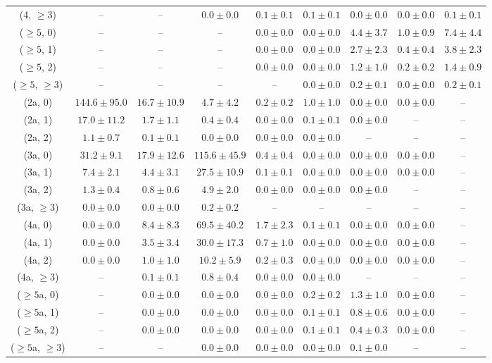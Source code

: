\begin{table}[h!]
{\begin{tabular}{ccccccccc}
	(4, $\ge3$) & -- & -- & $0.0\pm 0.0$ & $0.1\pm 0.1$ & $0.1\pm 0.1$ & $0.0\pm 0.0$ & $0.0\pm 0.0$ & $0.1\pm 0.1$ \\[0.5ex] 
	($\ge5$, 0) & -- & -- & -- & $0.0\pm 0.0$ & $0.0\pm 0.0$ & $4.4\pm 3.7$ & $1.0\pm 0.9$ & $7.4\pm 4.4$ \\[0.5ex] 
	($\ge5$, 1) & -- & -- & -- & $0.0\pm 0.0$ & $0.0\pm 0.0$ & $2.7\pm 2.3$ & $0.4\pm 0.4$ & $3.8\pm 2.3$ \\[0.5ex] 
	($\ge5$, 2) & -- & -- & -- & $0.0\pm 0.0$ & $0.0\pm 0.0$ & $1.2\pm 1.0$ & $0.2\pm 0.2$ & $1.4\pm 0.9$ \\[0.5ex] 
	($\ge5$, $\ge3$) & -- & -- & -- & -- & $0.0\pm 0.0$ & $0.2\pm 0.1$ & $0.0\pm 0.0$ & $0.2\pm 0.1$ \\[0.5ex] 
	(2a, 0) & $144.6\pm 95.0$ & $16.7\pm 10.9$ & $4.7\pm 4.2$ & $0.2\pm 0.2$ & $1.0\pm 1.0$ & $0.0\pm 0.0$ & $0.0\pm 0.0$ & -- \\[0.5ex] 
	(2a, 1) & $17.0\pm 11.2$ & $1.7\pm 1.1$ & $0.4\pm 0.4$ & $0.0\pm 0.0$ & $0.1\pm 0.1$ & $0.0\pm 0.0$ & -- & -- \\[0.5ex] 
	(2a, 2) & $1.1\pm 0.7$ & $0.1\pm 0.1$ & $0.0\pm 0.0$ & $0.0\pm 0.0$ & $0.0\pm 0.0$ & -- & -- & -- \\[0.5ex] 
	(3a, 0) & $31.2\pm 9.1$ & $17.9\pm 12.6$ & $115.6\pm 45.9$ & $0.4\pm 0.4$ & $0.0\pm 0.0$ & $0.0\pm 0.0$ & $0.0\pm 0.0$ & -- \\[0.5ex] 
	(3a, 1) & $7.4\pm 2.1$ & $4.4\pm 3.1$ & $27.5\pm 10.9$ & $0.1\pm 0.1$ & $0.0\pm 0.0$ & $0.0\pm 0.0$ & $0.0\pm 0.0$ & -- \\[0.5ex] 
	(3a, 2) & $1.3\pm 0.4$ & $0.8\pm 0.6$ & $4.9\pm 2.0$ & $0.0\pm 0.0$ & $0.0\pm 0.0$ & $0.0\pm 0.0$ & -- & -- \\[0.5ex] 
	(3a, $\ge3$) & $0.0\pm 0.0$ & $0.0\pm 0.0$ & $0.2\pm 0.2$ & -- & -- & -- & -- & -- \\[0.5ex] 
	(4a, 0) & $0.0\pm 0.0$ & $8.4\pm 8.3$ & $69.5\pm 40.2$ & $1.7\pm 2.3$ & $0.1\pm 0.1$ & $0.0\pm 0.0$ & $0.0\pm 0.0$ & -- \\[0.5ex] 
	(4a, 1) & $0.0\pm 0.0$ & $3.5\pm 3.4$ & $30.0\pm 17.3$ & $0.7\pm 1.0$ & $0.0\pm 0.0$ & $0.0\pm 0.0$ & $0.0\pm 0.0$ & -- \\[0.5ex] 
	(4a, 2) & $0.0\pm 0.0$ & $1.0\pm 1.0$ & $10.2\pm 5.9$ & $0.2\pm 0.3$ & $0.0\pm 0.0$ & $0.0\pm 0.0$ & $0.0\pm 0.0$ & -- \\[0.5ex] 
	(4a, $\ge3$) & -- & $0.1\pm 0.1$ & $0.8\pm 0.4$ & $0.0\pm 0.0$ & $0.0\pm 0.0$ & -- & -- & -- \\[0.5ex] 
	($\ge5$a, 0) & -- & $0.0\pm 0.0$ & $0.0\pm 0.0$ & $0.0\pm 0.0$ & $0.2\pm 0.2$ & $1.3\pm 1.0$ & $0.0\pm 0.0$ & -- \\[0.5ex] 
	($\ge5$a, 1) & -- & $0.0\pm 0.0$ & $0.0\pm 0.0$ & $0.0\pm 0.0$ & $0.1\pm 0.1$ & $0.8\pm 0.6$ & $0.0\pm 0.0$ & -- \\[0.5ex] 
	($\ge5$a, 2) & -- & $0.0\pm 0.0$ & $0.0\pm 0.0$ & $0.0\pm 0.0$ & $0.1\pm 0.1$ & $0.4\pm 0.3$ & $0.0\pm 0.0$ & -- \\[0.5ex] 
	($\ge5$a, $\ge3$) & -- & -- & $0.0\pm 0.0$ & $0.0\pm 0.0$ & $0.0\pm 0.0$ & $0.1\pm 0.0$ & -- & -- \\[0.5ex] 
	\hline
	\hline
\end{tabular}}
\end{table}
